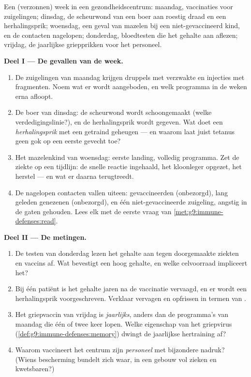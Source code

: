 \begin{problem}\label{pb:g9:immune-defenses:1}
Een (verzonnen) week in een gezondheidscentrum: maandag,
vaccinaties voor zuigelingen; dinsdag, de scheurwond van een boer
aan roestig draad en een herhalingsprik; woensdag, een geval van
mazelen bij een niet-gevaccineerd kind, en de contacten
nagelopen; donderdag, bloedtesten die het gehalte aan 
aflezen; vrijdag, de jaarlijkse griepprikken voor het personeel.

\medskip\noindent\textbf{Deel I --- De gevallen van de week.}
\begin{enumerate}
  \item De zuigelingen van maandag krijgen druppels met verzwakte
         en injecties met fragmenten. Noem wat er wordt
        aangeboden, en welk programma in de weken erna
        afloopt.
  \item De boer van dinsdag: de scheurwond wordt schoongemaakt
        (welke verdedigingslinie?), en de herhalingsprik wordt
        gegeven. Wat doet een \emph{herhalingsprik} met een
        getraind geheugen --- en waarom laat juist tetanus geen
        gok op een eerste gevecht toe?
  \item Het mazelenkind van woensdag: eerste landing, volledig
        programma. Zet de ziekte op een tijdlijn: de snelle
        reactie ingehaald, het kloonleger opgezet, het herstel ---
        en wat er daarna terugtreedt.
  \item De nagelopen contacten vallen uiteen: gevaccineerden
        (onbezorgd), lang geleden genezenen (onbezorgd), en één
        niet-gevaccineerde zuigeling, angstig in de gaten
        gehouden. Lees elk met de eerste vraag van
        \cref{met:g9:immune-defenses:read}.
\end{enumerate}

\medskip\noindent\textbf{Deel II --- De metingen.}
\begin{enumerate}[resume]
  \item De testen van donderdag lezen het gehalte aan 
        tegen doorgemaakte ziekten en vaccins af. Wat bevestigt
        een hoog gehalte, en welke celvoorraad impliceert het?
  \item Bij één patiënt is het gehalte jaren na de vaccinatie
        vervaagd, en er wordt een herhalingsprik voorgeschreven.
        Verklaar vervagen en opfrissen in termen van
        .
  \item Het griepvaccin van vrijdag is \emph{jaarlijks}, anders
        dan de programma's van maandag die één of twee keer
        lopen. Welke eigenschap van het griepvirus
        (\cref{def:g9:immune-defenses:memory}) dwingt de
        jaarlijkse hertraining af?
  \item Waarom vaccineert het centrum zijn \emph{personeel} met
        bijzondere nadruk? (Wiens bescherming bundelt zich waar,
        in een gebouw vol zieken en kwetsbaren?)
\end{enumerate}


\end{problem}
